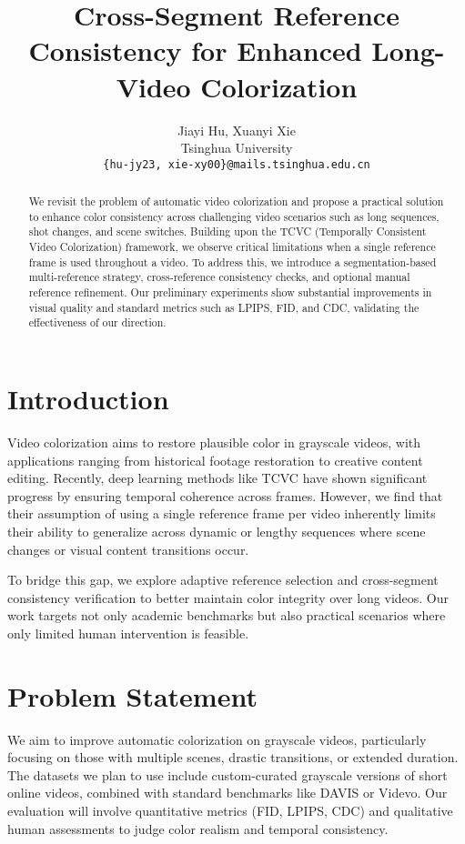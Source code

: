 \documentclass[10pt,twocolumn,letterpaper]{article}
\begin{document}
\title{Cross-Segment Reference Consistency for Enhanced Long-Video Colorization}

\author{Jiayi Hu, Xuanyi Xie\\
Tsinghua University\\
{\tt\small \{hu-jy23, xie-xy00\}@mails.tsinghua.edu.cn}}

\maketitle

\begin{abstract}
We revisit the problem of automatic video colorization and propose a practical solution to enhance color consistency across challenging video scenarios such as long sequences, shot changes, and scene switches. Building upon the TCVC (Temporally Consistent Video Colorization) framework, we observe critical limitations when a single reference frame is used throughout a video. To address this, we introduce a segmentation-based multi-reference strategy, cross-reference consistency checks, and optional manual reference refinement. Our preliminary experiments show substantial improvements in visual quality and standard metrics such as LPIPS, FID, and CDC, validating the effectiveness of our direction.
\end{abstract}

\section{Introduction}
Video colorization aims to restore plausible color in grayscale videos, with applications ranging from historical footage restoration to creative content editing. Recently, deep learning methods like TCVC have shown significant progress by ensuring temporal coherence across frames. However, we find that their assumption of using a single reference frame per video inherently limits their ability to generalize across dynamic or lengthy sequences where scene changes or visual content transitions occur.

To bridge this gap, we explore adaptive reference selection and cross-segment consistency verification to better maintain color integrity over long videos. Our work targets not only academic benchmarks but also practical scenarios where only limited human intervention is feasible.

\section{Problem Statement}
We aim to improve automatic colorization on grayscale videos, particularly focusing on those with multiple scenes, drastic transitions, or extended duration. The datasets we plan to use include custom-curated grayscale versions of short online videos, combined with standard benchmarks like DAVIS or Videvo. Our evaluation will involve quantitative metrics (FID, LPIPS, CDC) and qualitative human assessments to judge color realism and temporal consistency.
\end{document}
